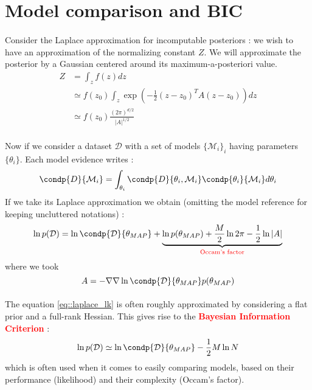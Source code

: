 \documentclass[a4paper]{article}
\begin{document}
	\section{Model comparison and BIC}
	{
			\paragraph{} Consider the Laplace approximation for incomputable posteriors : we wish to have an approximation of the normalizing constant $Z$. We will approximate the posterior by a Gaussian centered around its maximum-a-posteriori value. 
			\begin{equation}
				\begin{aligned}
					Z &= \int_z f(z)dz \\
				 	   &\simeq f(z_0)\int_z \exp{\left(-\frac{1}{2}(z-z_0)^TA(z-z_0)\right)}dz\\
					   &\simeq f(z_0)\frac{(2\pi)^{d/2}}{\vert A\vert^{1/2}}
				\end{aligned}
			\end{equation}
			
			\paragraph{} Now if we consider a dataset $\mathcal{D}$ with a set of models $\{\mathcal{M}_i\}_i$ having parameters $\{\theta_i\}$. Each model evidence writes : 
			\begin{equation}
				\condp{D}{\mathcal{M}_i} = \int_{\theta_i} \condp{D}{\theta_i,\mathcal{M}_i}\condp{\theta_i}{\mathcal{M}_i}d\theta_i
			\end{equation}
			If we take its Laplace approximation we obtain (omitting the model reference for keeping uncluttered notations) : 
			\begin{equation}
				\ln p(\mathcal{D}) = \ln \condp{\mathcal{D}}{\theta_{MAP}} +\underbrace{\ln p(\theta_{MAP}) + \frac{M}{2}\ln 2\pi- \frac{1}{2}\ln\vert A\vert}_{\text{\textcolor{red}{Occam's factor}}} 
				\label{eq::laplace_lk}
			\end{equation}
			where we took 
			\begin{equation}
				A = -\nabla \nabla \ln\condp{\mathcal{D}}{\theta_{MAP}}p(\theta_{MAP})
			\end{equation}
			
			\paragraph{} The equation \eqref{eq::laplace_lk} is often roughly approximated by considering a flat prior and a full-rank Hessian. This gives rise to the \textbf{\textcolor{red}{Bayesian Information Criterion}} : 
			\begin{equation}
				\ln p(\mathcal{D}) \simeq \ln\condp{\mathcal{D}}{\theta_{MAP}} - \frac{1}{2}M\ln N
			\end{equation}
			which is often used when it comes to easily comparing models, based on their performance (likelihood) and their complexity (Occam's factor). 
	}
	
\end{document}
